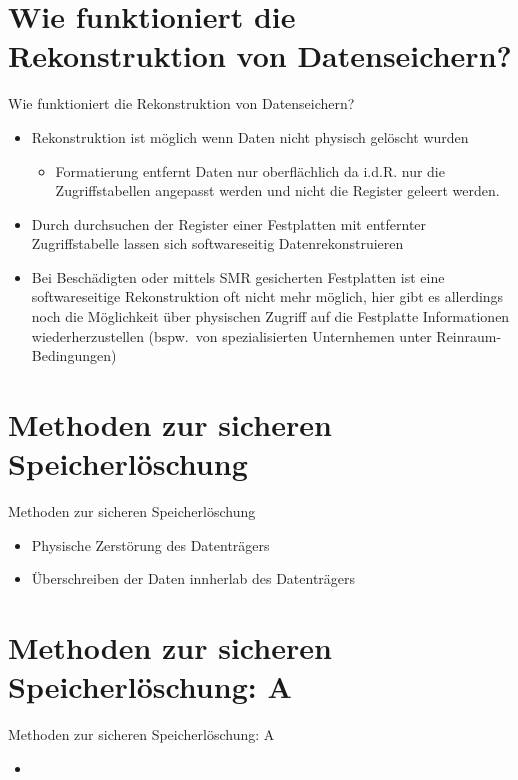 \documentclass{beamer}
\begin{document}
\section{Wie funktioniert die Rekonstruktion von Datenseichern?}
\begin{frame}{Wie funktioniert die Rekonstruktion von Datenseichern?}
	\begin{itemize}
		\item Rekonstruktion ist möglich wenn Daten nicht physisch gelöscht
			wurden
			\begin{itemize}
				\item Formatierung entfernt Daten nur oberflächlich da i.d.R.
					nur die Zugriffstabellen angepasst werden und nicht die
					Register geleert werden.
			\end{itemize}
		\item Durch durchsuchen der Register einer Festplatten mit entfernter
			Zugriffstabelle lassen sich softwareseitig Datenrekonstruieren
		\item Bei Beschädigten oder mittels SMR gesicherten Festplatten ist
			eine softwareseitige Rekonstruktion oft nicht mehr möglich, hier
			gibt es allerdings noch die Möglichkeit über physischen Zugriff auf
			die Festplatte Informationen wiederherzustellen (bspw.\ von
			spezialisierten Unternhemen unter Reinraum-Bedingungen)
	\end{itemize}
\end{frame}

\section{Methoden zur sicheren Speicherlöschung}
\begin{frame}{Methoden zur sicheren Speicherlöschung}
	\begin{itemize}
		\item Physische Zerstörung des Datenträgers
		\item Überschreiben der Daten innherlab des Datenträgers
	\end{itemize}
\end{frame}

\section{Methoden zur sicheren Speicherlöschung: A}
\begin{frame}{Methoden zur sicheren Speicherlöschung: A}
	\begin{itemize}
		\item 
	\end{itemize}
\end{frame}
\end{document}

